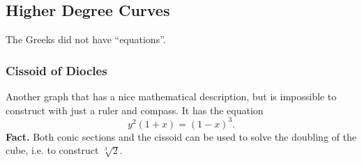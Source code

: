 \documentclass[class=article, crop=false]{standalone}
\begin{document}
  \subsection{Higher Degree Curves}
  \begin{note}{}
    The Greeks did not have ``equations''.
  \end{note}
  \subsubsection{Cissoid of Diocles}
  Another graph that has a nice mathematical description, but is impossible to construct with just a ruler and compass. It has the equation
  \[
    y^2(1 + x) = (1 - x)^3. \tag{$0 \leq x\leq 1$}
  \]
  \textbf{Fact.} Both conic sections and the cissoid can be used to solve the doubling of the cube, i.e. to construct $\sqrt[3]{2}$.
\end{document}

